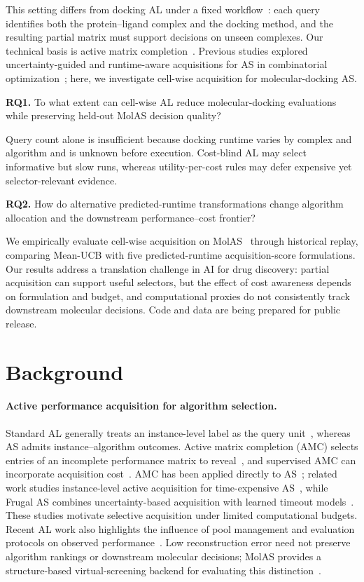 \documentclass{article}
\begin{document}
This setting differs from docking AL under a fixed workflow~\citep{graff2021accelerating,marin2024regression}: each query identifies both the protein--ligand complex and the docking method, and the resulting partial matrix must support decisions on unseen complexes. Our technical basis is active matrix completion~\citep{misir2019active}. Previous studies explored uncertainty-guided and runtime-aware acquisitions for AS in combinatorial optimization~\citep{volpato2019active,kus2026frugal}; here, we investigate cell-wise acquisition for molecular-docking AS.

\noindent\textbf{RQ1.} To what extent can cell-wise AL reduce molecular-docking evaluations while preserving held-out MolAS decision quality?

Query count alone is insufficient because docking runtime varies by complex and algorithm and is unknown before execution. Cost-blind AL may select informative but slow runs, whereas utility-per-cost rules may defer expensive yet selector-relevant evidence.

\noindent\textbf{RQ2.} How do alternative predicted-runtime transformations change algorithm allocation and the downstream performance--cost frontier?

We empirically evaluate cell-wise acquisition on MolAS~\citep{wang2026molecular} through historical replay, comparing Mean-UCB with five predicted-runtime acquisition-score formulations. Our results address a translation challenge in AI for drug discovery: partial acquisition can support useful selectors, but the effect of cost awareness depends on formulation and budget, and computational proxies do not consistently track downstream molecular decisions. Code and data are being prepared for public release.

\section{Background}
\paragraph{Active performance acquisition for algorithm selection.}
Standard AL generally treats an instance-level label as the query unit~\citep{tharwat2023survey}, whereas AS admits instance--algorithm outcomes. Active matrix completion (AMC) selects entries of an incomplete performance matrix to reveal~\citep{chakraborty2013active}, and supervised AMC can incorporate acquisition cost~\citep{huang2018afasmc}. AMC has been applied directly to AS~\citep{misir2019active}; related work studies instance-level active acquisition for time-expensive AS~\citep{volpato2019active}, while Frugal AS combines uncertainty-based acquisition with learned timeout models~\citep{kus2026frugal}. These studies motivate selective acquisition under limited computational budgets. Recent AL work also highlights the influence of pool management and evaluation protocols on observed performance~\citep{huseljic2026refine}. Low reconstruction error need not preserve algorithm rankings or downstream molecular decisions; MolAS provides a structure-based virtual-screening backend for evaluating this distinction~\citep{wang2026molecular}.
\end{document}
